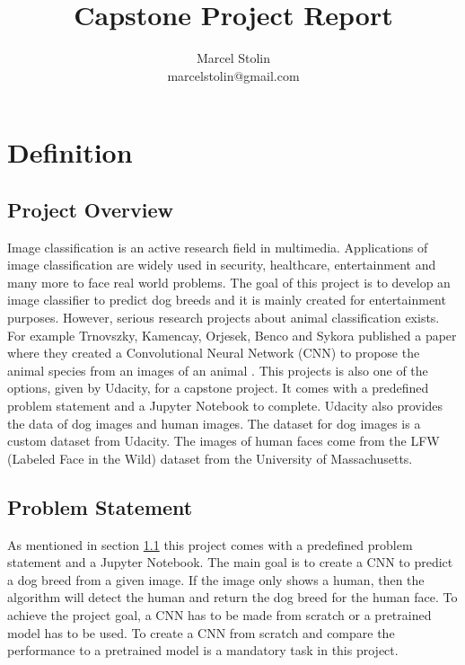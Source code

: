 \documentclass{article}
\title{Capstone Project Report}
\date{}
\author{Marcel Stolin \\ marcelstolin@gmail.com}
\begin{document}
\maketitle

\section{Definition} \label{s_definition}

\subsection{Project Overview} \label{su_project_overview}
Image classification is an active research field in multimedia. Applications of image classification are widely used in security, healthcare, entertainment and many more to face real world problems.
The goal of this project is to develop an image classifier to predict dog breeds and it is mainly created for entertainment purposes. However, serious research projects about animal classification exists. For example Trnovszky, Kamencay, Orjesek, Benco and Sykora published a paper where they created a Convolutional Neural Network (CNN) to propose the animal species from an images of an animal \cite{animal_rec}.\newline
This projects is also one of the options, given by Udacity, for a capstone project. It comes with a predefined problem statement and a Jupyter Notebook to complete. Udacity also provides the data of dog images and human images. The dataset for dog images is a custom dataset from Udacity. The images of human faces come from the LFW (Labeled Face in the Wild) \cite{lfw} dataset from the University of Massachusetts.

\subsection{Problem Statement} \label{su_problem_statement}
As mentioned in section \ref{su_project_overview} this project comes with a predefined problem statement and a Jupyter Notebook. The main goal is to create a CNN to predict a dog breed from a given image. If the image only shows a human, then the algorithm will detect the human and return the dog breed for the human face. To achieve the project goal, a CNN has to be made from scratch or a pretrained model has to be used. To create a CNN from scratch and compare the performance to a pretrained model is a mandatory task in this project.\newline
\end{document}
